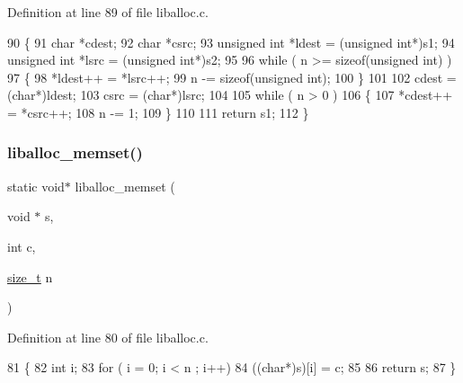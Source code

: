 Definition at line 89 of file liballoc.\+c.


\begin{DoxyCode}
90 \{
91   \textcolor{keywordtype}{char} *cdest;
92   \textcolor{keywordtype}{char} *csrc;
93   \textcolor{keywordtype}{unsigned} \textcolor{keywordtype}{int} *ldest = (\textcolor{keywordtype}{unsigned} \textcolor{keywordtype}{int}*)s1;
94   \textcolor{keywordtype}{unsigned} \textcolor{keywordtype}{int} *lsrc  = (\textcolor{keywordtype}{unsigned} \textcolor{keywordtype}{int}*)s2;
95 
96   \textcolor{keywordflow}{while} ( n >= \textcolor{keyword}{sizeof}(\textcolor{keywordtype}{unsigned} \textcolor{keywordtype}{int}) )
97   \{
98       *ldest++ = *lsrc++;
99       n -= \textcolor{keyword}{sizeof}(\textcolor{keywordtype}{unsigned} int);
100   \}
101 
102   cdest = (\textcolor{keywordtype}{char}*)ldest;
103   csrc  = (\textcolor{keywordtype}{char}*)lsrc;
104   
105   \textcolor{keywordflow}{while} ( n > 0 )
106   \{
107       *cdest++ = *csrc++;
108       n -= 1;
109   \}
110   
111   \textcolor{keywordflow}{return} s1;
112 \}
\end{DoxyCode}
\mbox{\label{a00035_ad824e94da51543e1febb05f96f0083ba_ad824e94da51543e1febb05f96f0083ba}} 
\subsubsection{\texorpdfstring{liballoc\+\_\+memset()}{liballoc\_memset()}}
{\footnotesize\ttfamily static void$\ast$ liballoc\+\_\+memset (\begin{DoxyParamCaption}\item[{void $\ast$}]{s,  }\item[{int}]{c,  }\item[{\hyperlink{a00038_a7c94ea6f8948649f8d181ae55911eeaf_a7c94ea6f8948649f8d181ae55911eeaf}{size\+\_\+t}}]{n }\end{DoxyParamCaption})\hspace{0.3cm}{\ttfamily [static]}}



Definition at line 80 of file liballoc.\+c.


\begin{DoxyCode}
81 \{
82     \textcolor{keywordtype}{int} i;
83     \textcolor{keywordflow}{for} ( i = 0; i < n ; i++)
84         ((\textcolor{keywordtype}{char}*)s)[i] = c;
85     
86     \textcolor{keywordflow}{return} s;
87 \}
\end{DoxyCode}
\mbox{\label{a00035_a7ac38fce3243a7dcf448301ee9ffd392_a7ac38fce3243a7dcf448301ee9ffd392}} 
